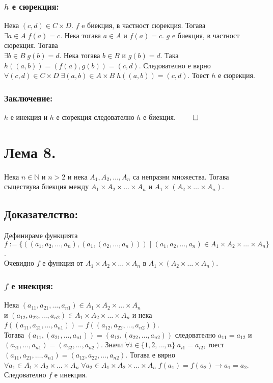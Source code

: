 \documentclass[a4paper, 12pt, oneside]{article}
\newcommand{\N}{\mathbb{N}}
\begin{document}
\subsubsection*{\(h\) е сюрекция:}
Нека \((c, d) \in C \times D\). \(f\) e биекция, в частност сюрекция.
Тогава \(\exists a \in A \; f(a) = c\). Нека тогава \(a \in A\) и \(f(a) = c\).
\(g\) e биекция, в частност сюрекция. Тогава \\
\(\exists b \in B \; g(b) = d\). Нека тогава \(b \in B\) и \(g(b) = d\).
Така \(h((a, b)) = (f(a), g(b)) = (c, d)\).
Следователно е вярно \(\forall (c, d) \in C \times D \; \exists (a, b) \in A \times B \; h((a, b)) = (c, d)\).
Тоест \(h\) е сюрекция.
\subsubsection*{Заключение:}
\(h\) е инекция и \(h\) е сюрекция следователно \(h\) е биекция. \(\qed\)
\section*{Лема 8.}
Нека \(n \in \N\) и \(n > 2\) и нека 
\(A_1, A_2, \dots, A_n\) са непразни множества.
Тогава съществува биекция между \(A_1 \times A_2 \times \dots \times A_n\)
и \(A_1 \times (A_2 \times \dots \times A_n)\).
\subsection*{Доказателство:}
Дефинираме функцията \\
\(f := \{((a_1, a_2, \dots, a_n), (a_1, (a_2, \dots, a_n))) \; | \; (a_1, a_2, \dots, a_n) \in A_1 \times A_2 \times \dots \times A_n\}\). \\
Очевидно \(f\) е функция от \(A_1 \times A_2 \times \dots \times A_n\) в \(A_1 \times (A_2 \times \dots \times A_n)\).
\subsubsection*{\(f\) е инекция:}
Нека \((a_{11}, a_{21}, \dots, a_{n1}) \in A_1 \times A_2 \times \dots \times A_n\) \\
и \((a_{12}, a_{22}, \dots, a_{n2}) \in A_1 \times A_2 \times \dots \times A_n\)
и нека \(f((a_{11}, a_{21}, \dots, a_{n1})) = f((a_{12}, a_{22}, \dots, a_{n2}))\). \\
Тогава \((a_{11}, (a_{21}, \dots, a_{n1})) = (a_{12}, (a_{22}, \dots, a_{n2}))\)
следователно \(a_{11} = a_{12}\) и \((a_{21}, \dots, a_{n1}) = (a_{22}, \dots, a_{n2})\).
Значи \(\forall i \in \{1, 2, \dots, n\} \; a_{i1} = a_{i2}\),
тоест \((a_{11}, a_{21}, \dots, a_{n1}) = (a_{12}, a_{22}, \dots, a_{n2})\).
Тогава е вярно \\
\(\forall a_1 \in A_1 \times A_2 \times \dots \times A_n \; \forall a_2 \in A_1 \times A_2 \times \dots \times A_n \; f(a_1) = f(a_2) \longrightarrow a_1 = a_2\).
Следователно \(f\) е инекция.
\end{document}
